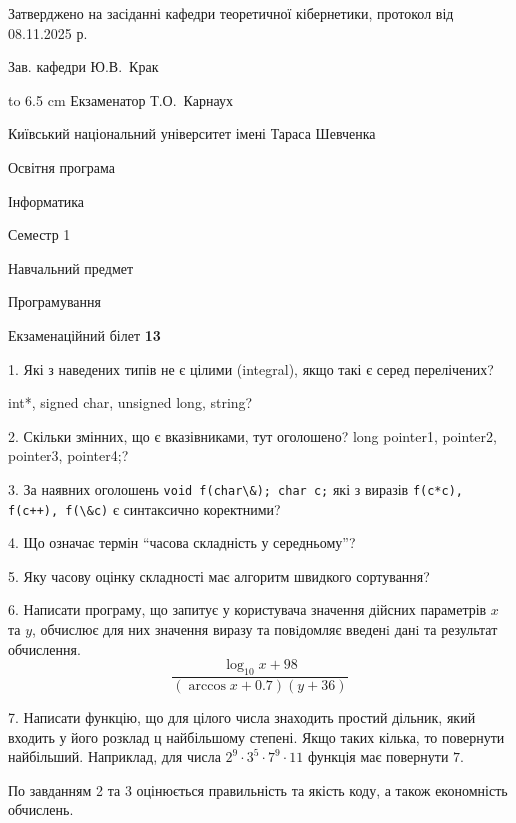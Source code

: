 \documentclass[12pt, ukrainian]{article}
\def\code#1{\Verb!#1!}
\begin{document}
{\smallskip\smallskip \begin {scriptsize} Затверджено на засіданні кафедри теоретичної кібернетики, протокол   від   08.11.2025 р.\par\smallskip\smallskip\smallskip\smallskip
{\parbox {6.5 cm} {Зав. кафедри \dotfill Ю.В.~Крак}}\hspace {0.7cm} {\hbox to 6.5 cm { Екзаменатор \dotfill Т.О.~Карнаух}} \end{scriptsize}}
\newpage
{{\begin {scriptsize}\par
{ \center  Київський національний університет імені Тараса Шевченка \par}
{\parbox {5 cm}{Освітня програма \hfill}{\parbox {7 cm}{Інформатика\hfill}}\parbox {6 cm}{\hfill Семестр 1}}\par
{\parbox {5 cm} {Навчальний предмет \hfill}\parbox {7 cm}{Програмування \hfill}\parbox {6cm}{\hfill}\par}\vspace{-15pt} \end{scriptsize}}{\center Екзаменаційний білет \No \textbf { 13 }\par}}
{%
1. Які з наведених типів не є цілими (integral), якщо такі є серед перелічених?

int*, signed char, unsigned long, string?
\par
\vspace{2mm}
2. Скільки змінних, що є вказівниками, тут оголошено?
long pointer1, pointer2, pointer3, pointer4;?
\par
\vspace{2mm}
3. За наявних оголошень \code{void f(char\&); char c;} які з виразів \code{f(c*c), f(c++), f(\&c)} є синтаксично коректними?
\par
\vspace{2mm}
4. Що означає термін ``часова складність у середньому''?
\par
\vspace{2mm}
5. Яку часову оцінку складності має алгоритм швидкого сортування?
\par
\vspace{2mm}
6. Написати програму, що запитує у користувача значення дійсних параметрів $x$ та $y$, обчислює для них значення виразу та повiдомляє введенi данi та результат обчислення.
$$\frac{\log_{10} x + 98}{(\arccos x + 0.7) (y + 36)}$$ 

\par
7. Написати функцію, що для цілого числа знаходить простий дільник, який входить у його розклад ц найбільшому степені. Якщо таких кілька, то повернути найбільший. Наприклад, для числа $2^{9}{\cdot}3^5{\cdot}7^9{\cdot}11$ функція має повернути $7$.

По завданням 2 та 3 оцінюється правильність та якість коду, а також економність обчислень.

}
\end{document}
